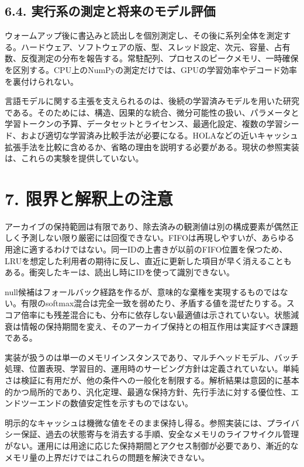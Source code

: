 \documentclass[11pt,a4paper]{article}
\begin{document}
\subsection{6.4. 実行系の測定と将来のモデル評価}\label{ux5b9fux884cux7cfbux306eux6e2cux5b9aux3068ux5c06ux6765ux306eux30e2ux30c7ux30ebux8a55ux4fa1}

ウォームアップ後に書込みと読出しを個別測定し、その後に系列全体を測定する。ハードウェア、ソフトウェアの版、型、スレッド設定、次元、容量、占有数、反復測定の分布を報告する。常駐配列、プロセスのピークメモリ、一時確保を区別する。CPU上のNumPyの測定だけでは、GPUの学習効率やデコード効率を裏付けられない。

言語モデルに関する主張を支えられるのは、後続の学習済みモデルを用いた研究である。そのためには、構造、因果的な統合、微分可能性の扱い、パラメータと学習トークンの予算、データセットとライセンス、最適化設定、複数の学習シード、および適切な学習済み比較手法が必要になる。HOLAなどの近いキャッシュ拡張手法を比較に含めるか、省略の理由を説明する必要がある。現状の参照実装は、これらの実験を提供していない。

\section{7. 限界と解釈上の注意}\label{ux9650ux754cux3068ux89e3ux91c8ux4e0aux306eux6ce8ux610f}

アーカイブの保持範囲は有限であり、除去済みの観測値は別の構成要素が偶然正しく予測しない限り厳密には回復できない。FIFOは再現しやすいが、あらゆる用途に適するわけではない。同一IDの上書きが以前のFIFO位置を保つため、LRUを想定した利用者の期待に反し、直近に更新した項目が早く消えることもある。衝突したキーは、読出し時にIDを使って識別できない。

null候補はフォールバック経路を作るが、意味的な棄権を実現するものではない。有限のsoftmax混合は完全一致を弱めたり、矛盾する値を混ぜたりする。スコア倍率にも残差混合にも、分布に依存しない最適値は示されていない。状態減衰は情報の保持期間を変え、そのアーカイブ保持との相互作用は実証すべき課題である。

実装が扱うのは単一のメモリインスタンスであり、マルチヘッドモデル、バッチ処理、位置表現、学習目的、運用時のサービング方針は定義されていない。単純さは検証に有用だが、他の条件への一般化を制限する。解析結果は意図的に基本的かつ局所的であり、汎化定理、最適な保持方針、先行手法に対する優位性、エンドツーエンドの数値安定性を示すものではない。

明示的なキャッシュは機微な値をそのまま保持し得る。参照実装には、プライバシー保証、過去の状態寄与を消去する手順、安全なメモリのライフサイクル管理がない。運用には用途に応じた保持期間とアクセス制御が必要であり、漸近的なメモリ量の上界だけではこれらの問題を解決できない。
\end{document}

